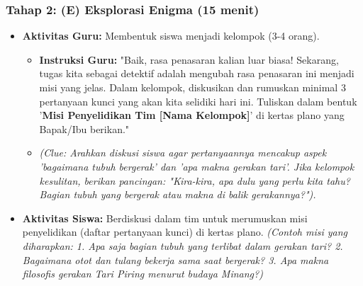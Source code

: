 \documentclass[a4paper,12pt]{article}
\begin{document}
\subsubsection{Tahap 2: (E) Eksplorasi Enigma (15 menit)}
\begin{itemize}
\item \textbf{Aktivitas Guru:} Membentuk siswa menjadi kelompok (3-4 orang).
    \begin{itemize}
    \item \textbf{Instruksi Guru:} "Baik, rasa penasaran kalian luar biasa! Sekarang, tugas kita sebagai detektif adalah mengubah rasa penasaran ini menjadi misi yang jelas. Dalam kelompok, diskusikan dan rumuskan minimal 3 pertanyaan kunci yang akan kita selidiki hari ini. Tuliskan dalam bentuk '\textbf{Misi Penyelidikan Tim [Nama Kelompok]}' di kertas plano yang Bapak/Ibu berikan."
    \item \textit{(Clue: Arahkan diskusi siswa agar pertanyaannya mencakup aspek 'bagaimana tubuh bergerak' dan 'apa makna gerakan tari'. Jika kelompok kesulitan, berikan pancingan: "Kira-kira, apa dulu yang perlu kita tahu? Bagian tubuh yang bergerak atau makna di balik gerakannya?").}
    \end{itemize}
\item \textbf{Aktivitas Siswa:} Berdiskusi dalam tim untuk merumuskan misi penyelidikan (daftar pertanyaan kunci) di kertas plano. \textit{(Contoh misi yang diharapkan: 1. Apa saja bagian tubuh yang terlibat dalam gerakan tari? 2. Bagaimana otot dan tulang bekerja sama saat bergerak? 3. Apa makna filosofis gerakan Tari Piring menurut budaya Minang?)}
\end{itemize}
\end{document}
